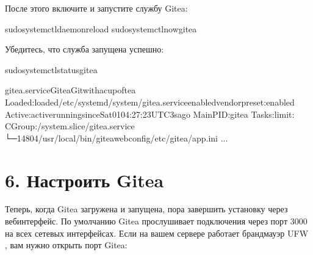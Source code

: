 \documentclass[letterpaper,10pt,russian]{sphinxmanual}
\begin{document}
\sphinxAtStartPar
После этого включите и запустите службу Gitea:

\begin{sphinxVerbatim}[commandchars=\\\{\}]
\PYGZdl{}sudosystemctldaemon\PYGZhy{}reload
\PYGZdl{}sudosystemctl\PYGZhy{}\PYGZhy{}nowgitea
\end{sphinxVerbatim}

\sphinxAtStartPar
Убедитесь, что служба запущена успешно:

\begin{sphinxVerbatim}[commandchars=\\\{\}]
\PYGZdl{}sudosystemctlstatusgitea
\end{sphinxVerbatim}

\begin{sphinxVerbatim}[commandchars=\\\{\}]
gitea.service\PYGZhy{}GiteaGitwithacupoftea
Loaded:loaded/etc/systemd/system/gitea.serviceenabledvendorpreset:enabled
Active:activerunningsinceSat\PYGZhy{}01\PYGZhy{}04:27:23UTC3sago
MainPID:gitea
Tasks:limit:
CGroup:/system.slice/gitea.service
└─14804/usr/local/bin/giteaweb\PYGZhy{}\PYGZhy{}config/etc/gitea/app.ini
...
\end{sphinxVerbatim}


\section{6. Настроить Gitea}
\label{\detokenize{git:id5}}
\sphinxAtStartPar
Теперь, когда Gitea загружена и запущена, пора завершить установку через веб\sphinxhyphen{}интерфейс.
По умолчанию Gitea прослушивает подключения через порт 3000 на всех сетевых интерфейсах.
Если на вашем сервере работает брандмауэр UFW , вам нужно открыть порт Gitea:
\end{document}
